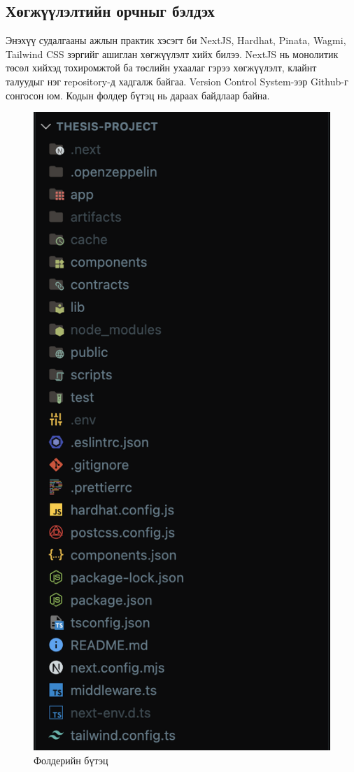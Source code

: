 \subsection{Хөгжүүлэлтийн орчныг бэлдэх}
Энэхүү судалгааны ажлын практик хэсэгт би NextJS, Hardhat, Pinata, Wagmi, Tailwind CSS зэргийг ашиглан хөгжүүлэлт хийх билээ. NextJS нь монолитик төсөл хийхэд тохиромжтой ба төслийн ухаалаг гэрээ хөгжүүлэлт, клайнт талуудыг нэг repository-д хадгалж байгаа. Version Control System-ээр Github-г сонгосон юм. Кодын фолдер бүтэц нь дараах байдлаар байна.

\begin{figure}[h]
	\centering
	\includegraphics[scale=0.3]{src/images/folder-structure.png}
	\caption{Фолдерийн бүтэц}
\end{figure}

